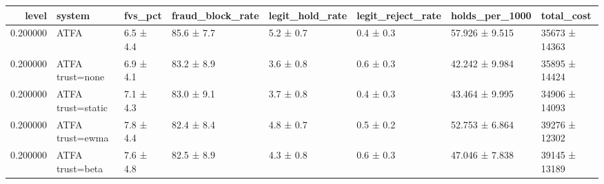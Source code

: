 \begin{tabular}{rlllllll}
\toprule
level & system & fvs\_pct & fraud\_block\_rate & legit\_hold\_rate & legit\_reject\_rate & holds\_per\_1000 & total\_cost \\
\midrule
0.200000 & ATFA & 6.5 ± 4.4 & 85.6 ± 7.7 & 5.2 ± 0.7 & 0.4 ± 0.3 & 57.926 ± 9.515 & 35673 ± 14363 \\
0.200000 & ATFA trust=none & 6.9 ± 4.1 & 83.2 ± 8.9 & 3.6 ± 0.8 & 0.6 ± 0.3 & 42.242 ± 9.984 & 35895 ± 14424 \\
0.200000 & ATFA trust=static & 7.1 ± 4.3 & 83.0 ± 9.1 & 3.7 ± 0.8 & 0.4 ± 0.3 & 43.464 ± 9.995 & 34906 ± 14093 \\
0.200000 & ATFA trust=ewma & 7.8 ± 4.4 & 82.4 ± 8.4 & 4.8 ± 0.7 & 0.5 ± 0.2 & 52.753 ± 6.864 & 39276 ± 12302 \\
0.200000 & ATFA trust=beta & 7.6 ± 4.8 & 82.5 ± 8.9 & 4.3 ± 0.8 & 0.6 ± 0.3 & 47.046 ± 7.838 & 39145 ± 13189 \\
\bottomrule
\end{tabular}

